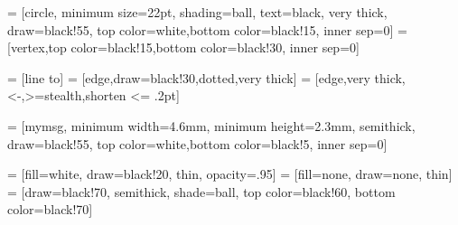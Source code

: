  = [circle, minimum size=22pt, shading=ball, text=black, very thick, draw=black!55, top color=white,bottom color=black!15, inner sep=0]
 = [vertex,top color=black!15,bottom color=black!30, inner sep=0]

 = [line to]
 = [edge,draw=black!30,dotted,very thick]
 = [edge,very thick,<-,>=stealth,shorten <= .2pt]


\makeatletter


 = [mymsg, minimum width=4.6mm, minimum height=2.3mm, semithick, draw=black!55, top color=white,bottom color=black!5, inner sep=0]

 =  [fill=white, draw=black!20, thin, opacity=.95]
 = [fill=none, draw=none, thin]
 =   [draw=black!70, semithick, shade=ball, top color=black!60, bottom color=black!70]

